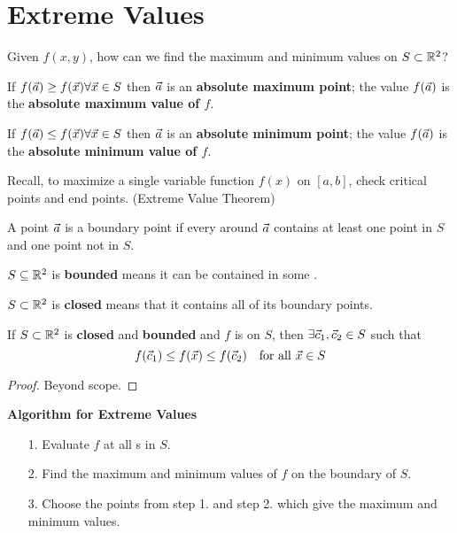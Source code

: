 \documentclass[english, 11pt]{article}
\begin{document}
\section{Extreme Values}

Given $f(x,y)$, how can we find the maximum and minimum values on $S \subset {\mathbb{R}}^2$?

\begin{defn}\label{absolute maximum point}
If $f(\vec{a}) \geq f(\vec{x}) \forall \vec{x} \in S$ then $\vec{a}$ is an \textbf{absolute maximum point}; the value $f(\vec{a})$ is the \textbf{absolute maximum value of $f$}.
\end{defn}


\begin{defn}\label{absolute minimum point}
If $f(\vec{a}) \leq f(\vec{x}) \forall \vec{x} \in S$ then $\vec{a}$ is an \textbf{absolute minimum point}; the value $f(\vec{a})$ is the \textbf{absolute minimum value of $f$}.
\end{defn}

Recall, to maximize a single variable function $f(x)$ on $[a,b]$, check critical points and end points. (Extreme Value Theorem) \\

\begin{defn}\label{boundary point}
  A point $\vec{a}$ is a boundary point if every  around $\vec{a}$ contains at least one point in $S$ and one point not in $S$.
\end{defn}

\begin{defn}[bounded]\label{bounded}
$S \subseteq {\mathbb{R}}^2$ is \textbf{bounded} means it can be contained in some .
\end{defn}

\begin{defn}[closed]\label{closed}
  $S \subset {\mathbb{R}}^2$ is \textbf{closed} means that it contains all of its boundary points.
\end{defn}

If $S \subset {\mathbb{R}}^2$ is \textbf{closed} and \textbf{bounded} and $f$ is  on $S$, then $\exists \vec{c}_1, \vec{c}_2 \in S$ such that
\[ f(\vec{c}_1) \leq f(\vec{x}) \leq f(\vec{c}_2) \mbox { \ \ for all $\vec{x} \in S$} \]
\begin{proof}
  Beyond scope.
\end{proof}

\textbf{Algorithm for Extreme Values} \\
\begin{itemize}
  \item[1.] Evaluate $f$ at all s in $S$.
  \item[2.] Find the maximum and minimum values of $f$ on the boundary of $S$.
  \item[3.] Choose the points from step 1. and step 2. which give the maximum and minimum values.
\end{itemize}
\end{document}
